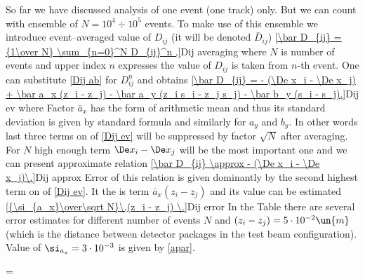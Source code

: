 So far we have discussed analysis of one event (one track) only. But we can count with ensemble of $N = 10^4 \div 10^5$ events. To make use of this ensemble we introduce event--averaged value of $D_{ij}$ (it will be denoted $\bar D_{ij}$)
\eqref{\bar D_{ij} = {1\over N} \sum_{n=0}^N D_{ij}^n ,}{Dij averaging}
where $N$ is number of events and upper index $n$ expresses the value of $D_{ij}$ is taken
from $n$-th event. One can substitute \ref{Dij ab} for $D_{ij}^n$ and obtains
\eqref{\bar D_{ij} =  - (\De x_i - \De x_j) + \bar a_x (z_i - z_j) - \bar a_y (z_i s_i - z_j s_j) - \bar b_y (s_i - s_j),}{Dij ev}
where
Factor $\bar a_x$ has the form of arithmetic mean and thus its standard deviation is given by standard formula
and similarly for $a_y$ and $b_y$. In other words last three terms on \rhs{} of \equ{} \ref{Dij ev}
will be suppressed by factor $\sqrt N$ after averaging. For $N$ high enough term $\De x_i - \De x_j$
will be the most important one and we can present approximate relation
\eqref{\bar D_{ij} \approx  - (\De x_i - \De x_j)\.}{Dij approx}
Error of this relation is given dominantly by the second highest term on \rhs{} of \equ{} \ref{Dij ev}. It the
is term $\bar a_x (z_i - z_j)$ and its value can be estimated
\eqref{{\si_{a_x}\over\sqrt N}\,(z_i - z_j) \.}{Dij error}
In the Table  there are several error estimates for different number of events $N$ and $(z_i - z_j) = 5\cdot 10^{-2}\un{m}$ (which is the distance between detector packages in the test beam configuration). Value of $\si_{a_x} = 3\cdot 10^{-3}$ is given by \equ{} \ref{apar}.

{\setbox\strutbox=\hbox{\vrule height14pt depth4pt width0pt}
}

